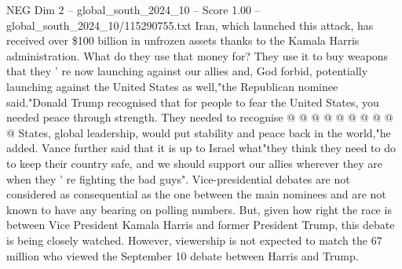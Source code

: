 \begin{textsample}{NEG Dim 2 – global\_south\_2024\_10 – Score 1.00 – global\_south\_2024\_10/115290755.txt}
Iran, which launched this attack, has received over \$100 billion in unfrozen assets thanks to the Kamala Harris administration.
What do they use that money for?
They use it to buy weapons that they ' re now launching against our allies and, God forbid, potentially launching against the United States as well,"the Republican nominee said."Donald Trump recognised that for people to fear the United States, you needed peace through strength.
They needed to recognise @ @ @ @ @ @ @ @ @ @ States, global leadership, would put stability and peace back in the world,"he added.
Vance further said that it is up to Israel what"they think they need to do to keep their country safe, and we should support our allies wherever they are when they ' re fighting the bad guys".
Vice-presidential debates are not considered as consequential as the one between the main nominees and are not known to have any bearing on polling numbers.
But, given how right the race is between Vice President Kamala Harris and former President Trump, this debate is being closely watched.
However, viewership is not expected to match the 67 million who viewed the September 10 debate between Harris and Trump.

\end{textsample}
